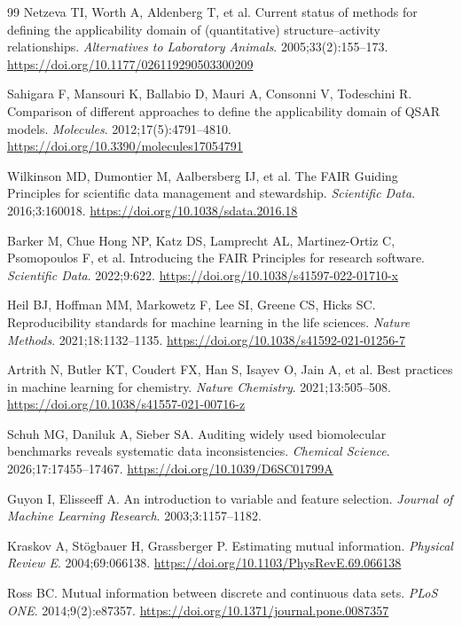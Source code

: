 \begin{thebibliography}{99}
Netzeva TI, Worth A, Aldenberg T, et al. Current status of methods for defining the applicability domain of (quantitative) structure--activity relationships. \emph{Alternatives to Laboratory Animals}. 2005;33(2):155--173. \url{https://doi.org/10.1177/026119290503300209}

Sahigara F, Mansouri K, Ballabio D, Mauri A, Consonni V, Todeschini R. Comparison of different approaches to define the applicability domain of QSAR models. \emph{Molecules}. 2012;17(5):4791--4810. \url{https://doi.org/10.3390/molecules17054791}

Wilkinson MD, Dumontier M, Aalbersberg IJ, et al. The FAIR Guiding Principles for scientific data management and stewardship. \emph{Scientific Data}. 2016;3:160018. \url{https://doi.org/10.1038/sdata.2016.18}

Barker M, Chue Hong NP, Katz DS, Lamprecht AL, Martinez-Ortiz C, Psomopoulos F, et al. Introducing the FAIR Principles for research software. \emph{Scientific Data}. 2022;9:622. \url{https://doi.org/10.1038/s41597-022-01710-x}

Heil BJ, Hoffman MM, Markowetz F, Lee SI, Greene CS, Hicks SC. Reproducibility standards for machine learning in the life sciences. \emph{Nature Methods}. 2021;18:1132--1135. \url{https://doi.org/10.1038/s41592-021-01256-7}

Artrith N, Butler KT, Coudert FX, Han S, Isayev O, Jain A, et al. Best practices in machine learning for chemistry. \emph{Nature Chemistry}. 2021;13:505--508. \url{https://doi.org/10.1038/s41557-021-00716-z}

Schuh MG, Daniluk A, Sieber SA. Auditing widely used biomolecular benchmarks reveals systematic data inconsistencies. \emph{Chemical Science}. 2026;17:17455--17467. \url{https://doi.org/10.1039/D6SC01799A}

Guyon I, Elisseeff A. An introduction to variable and feature selection. \emph{Journal of Machine Learning Research}. 2003;3:1157--1182.

Kraskov A, St\"ogbauer H, Grassberger P. Estimating mutual information. \emph{Physical Review E}. 2004;69:066138. \url{https://doi.org/10.1103/PhysRevE.69.066138}

Ross BC. Mutual information between discrete and continuous data sets. \emph{PLoS ONE}. 2014;9(2):e87357. \url{https://doi.org/10.1371/journal.pone.0087357}


\end{thebibliography}
